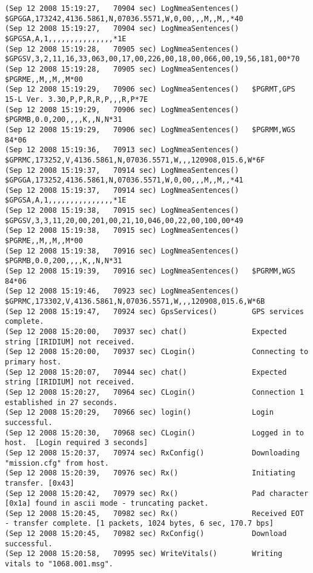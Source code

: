 {\begin{verbatim}
(Sep 12 2008 15:19:27,   70904 sec) LogNmeaSentences()   $GPGGA,173242,4136.5861,N,07036.5571,W,0,00,,,M,,M,,*40
(Sep 12 2008 15:19:27,   70904 sec) LogNmeaSentences()   $GPGSA,A,1,,,,,,,,,,,,,,,*1E
(Sep 12 2008 15:19:28,   70905 sec) LogNmeaSentences()   $GPGSV,3,2,11,16,33,063,00,17,00,226,00,18,00,066,00,19,56,181,00*70
(Sep 12 2008 15:19:28,   70905 sec) LogNmeaSentences()   $PGRME,,M,,M,,M*00
(Sep 12 2008 15:19:29,   70906 sec) LogNmeaSentences()   $PGRMT,GPS 15-L Ver. 3.30,P,P,R,R,P,,,R,P*7E
(Sep 12 2008 15:19:29,   70906 sec) LogNmeaSentences()   $PGRMB,0.0,200,,,,K,,N,N*31
(Sep 12 2008 15:19:29,   70906 sec) LogNmeaSentences()   $PGRMM,WGS 84*06
(Sep 12 2008 15:19:36,   70913 sec) LogNmeaSentences()   $GPRMC,173252,V,4136.5861,N,07036.5571,W,,,120908,015.6,W*6F
(Sep 12 2008 15:19:37,   70914 sec) LogNmeaSentences()   $GPGGA,173252,4136.5861,N,07036.5571,W,0,00,,,M,,M,,*41
(Sep 12 2008 15:19:37,   70914 sec) LogNmeaSentences()   $GPGSA,A,1,,,,,,,,,,,,,,,*1E
(Sep 12 2008 15:19:38,   70915 sec) LogNmeaSentences()   $GPGSV,3,3,11,20,00,201,00,21,10,046,00,22,00,100,00*49
(Sep 12 2008 15:19:38,   70915 sec) LogNmeaSentences()   $PGRME,,M,,M,,M*00
(Sep 12 2008 15:19:38,   70916 sec) LogNmeaSentences()   $PGRMB,0.0,200,,,,K,,N,N*31
(Sep 12 2008 15:19:39,   70916 sec) LogNmeaSentences()   $PGRMM,WGS 84*06
(Sep 12 2008 15:19:46,   70923 sec) LogNmeaSentences()   $GPRMC,173302,V,4136.5861,N,07036.5571,W,,,120908,015.6,W*6B
(Sep 12 2008 15:19:47,   70924 sec) GpsServices()        GPS services complete.
(Sep 12 2008 15:20:00,   70937 sec) chat()               Expected string [IRIDIUM] not received.
(Sep 12 2008 15:20:00,   70937 sec) CLogin()             Connecting to primary host.
(Sep 12 2008 15:20:07,   70944 sec) chat()               Expected string [IRIDIUM] not received.
(Sep 12 2008 15:20:27,   70964 sec) CLogin()             Connection 1 established in 27 seconds.
(Sep 12 2008 15:20:29,   70966 sec) login()              Login successful.
(Sep 12 2008 15:20:30,   70968 sec) CLogin()             Logged in to host.  [Login required 3 seconds]
(Sep 12 2008 15:20:37,   70974 sec) RxConfig()           Downloading "mission.cfg" from host.
(Sep 12 2008 15:20:39,   70976 sec) Rx()                 Initiating transfer. [0x43]
(Sep 12 2008 15:20:42,   70979 sec) Rx()                 Pad character [0x1a] found in ascii mode - truncating packet.
(Sep 12 2008 15:20:45,   70982 sec) Rx()                 Received EOT - transfer complete. [1 packets, 1024 bytes, 6 sec, 170.7 bps]
(Sep 12 2008 15:20:45,   70982 sec) RxConfig()           Download successful.
(Sep 12 2008 15:20:58,   70995 sec) WriteVitals()        Writing vitals to "1068.001.msg".

\end{verbatim}}
